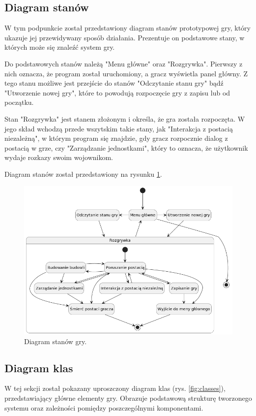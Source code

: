\subsection{Diagram stanów}\label{ss:state}
W tym podpunkcie został przedstawiony diagram stanów prototypowej gry, który ukazuje jej przewidywany sposób działania.
Prezentuje on podstawowe stany, w których może się znaleźć system gry.

Do podstawowych stanów należą "Menu główne" oraz "Rozgrywka". Pierwszy z nich oznacza, że program został uruchomiony, a
gracz wyświetla panel główny. Z tego stanu możliwe jest przejście do stanów "Odczytanie stanu gry" bądź "Utworzenie
nowej gry", które to powodują rozpoczęcie gry z zapisu lub od początku.

Stan "Rozgrywka" jest stanem złożonym i określa, że gra została rozpoczęta. W jego skład wchodzą przede wszytskim takie
stany, jak "Interakcja z postacią niezależną", w którym program się znajdzie, gdy gracz rozpocznie dialog z postacią w grze,
czy "Zarządzanie jednostkami", który to oznacza, że użytkownik wydaje rozkazy swoim wojownikom.

Diagram stanów został przedstawiony na rysunku \ref{fig:states}.

\begin{figure}[!htbp]
    \centering
    \includegraphics[width=1.0\textwidth]{images/diagrams/state.jpg}
    \caption{Diagram stanów gry.}\label{fig:states}
\end{figure}
\FloatBarrier

\subsection{Diagram klas}\label{ss:class}
W tej sekcji został pokazany uproszczony diagram klas (rys. \ref{fig:classes}), przedstawiający główne elementy gry.
Obrazuje podstawową strukturę tworzonego systemu oraz zależności pomiędzy poszczególnymi komponentami.

